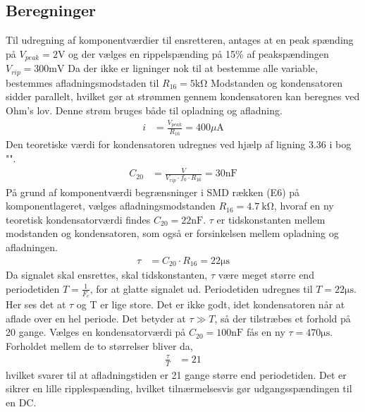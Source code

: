 \subsection{Beregninger}
Til udregning af komponentværdier til ensretteren, antages at en peak spænding på $V_{peak} = 2\si{\volt}$ og der vælges en rippelspænding på 15\% af peakspændingen $V_{rip} = 300 \si{\milli\volt}$
Da der ikke er ligninger nok til at bestemme alle variable, bestemmes afladningsmodstaden til $R_{16} = 5 \si{\kilo\ohm}$
Modstanden og kondensatoren sidder parallelt, hvilket gør at strømmen gennem kondensatoren kan beregnes ved Ohm's lov. Denne strøm bruges både til opladning og afladning.
\begin{align}
	i & = \frac{V_{peak}}{R_{16}} = 400 \si{\mu\ampere}
\end{align}
Den teoretiske værdi for kondensatoren udregnes ved hjælp af ligning 3.36 i bog "\cite[side. 160]{Sedra19uu}".
\begin{align}
	C_{20} & = \frac{V}{V_{rip} \cdot f_0 \cdot R_{16}} = 30\si{\nano\farad}
\end{align}
På grund af komponentværdi begrænsninger i SMD rækken (E6) på komponentlageret, vælges afladningsmodstanden $R_{16} = \SI{4.7}{\kilo\ohm}$, hvoraf en ny teoretisk kondensatorværdi findes $C_{20} = 22 \si{\nano\farad}$.
$\tau$ er tidskonstanten mellem modstanden og kondensatoren, som også er forsinkelsen mellem opladning og afladningen. 
\begin{align}
	\tau & = C_{20} \cdot R_{16} = 22\si{\micro\second}
\end{align}
Da signalet skal ensrettes, skal tidskonstanten, $\tau$ være meget større end periodetiden $T = \frac{1}{F_c}$, for at glatte signalet ud. Periodetiden udregnes til $T = 22 \si{\micro\second}$. Her ses det at $\tau$ og T er lige store. Det er ikke godt, idet kondensatoren når at aflade over en hel periode. Det betyder at $\tau \gg T$, så der tilstræbes et forhold på 20 gange.
Vælges en kondensatorværdi på $C_{20} = 100 \si{\nano\farad}$ fås en ny $\tau = 470\si{\micro\second}$. Forholdet mellem de to størrelser bliver da, 
\begin{align}
	\frac{\tau}{T} & = 21
\end{align}
hvilket svarer til at afladningstiden er 21 gange større end periodetiden. Det er sikrer en lille ripplespænding, hvilket tilnærmelsesvis gør udgangsspændingen til en DC.